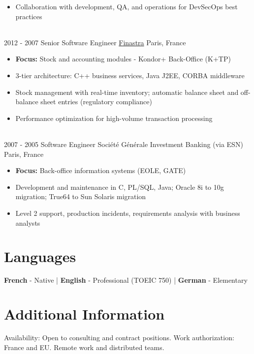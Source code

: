 \documentclass[letterpaper]{twentysecondcv} %
\begin{document}
\begin{twentytimeline}
{\begin{itemize}
		\item Collaboration with development, QA, and operations for DevSecOps best practices
		\end{itemize}}
	\\
	\twentyitemtimeline{\faCode}
		{2012 -}
		{2007}
		{Senior Software Engineer}
		{\href{https://finastra.com}{Finastra}}
		{Paris, France}
		{\begin{itemize}
		\item \textbf{Focus:} Stock and accounting modules - Kondor+ Back-Office (K+TP)
		\item 3-tier architecture: C++ business services, Java J2EE, CORBA middleware
		\item Stock management with real-time inventory; automatic balance sheet and off-balance sheet entries (regulatory compliance)
		\item Performance optimization for high-volume transaction processing
		\end{itemize}}
	\\
	\twentyitemtimeline{\faBriefcase}
		{2007 -}
		{2005}
		{Software Engineer}
		{Société Générale Investment Banking (via ESN)}
		{Paris, France}
		{\begin{itemize}
		\item \textbf{Focus:} Back-office information systems (EOLE, GATE)
		\item Development and maintenance in C, PL/SQL, Java; Oracle 8i to 10g migration; True64 to Sun Solaris migration
		\item Level 2 support, production incidents, requirements analysis with business analysts
		\end{itemize}}
\end{twentytimeline}


\section{Languages}

\textbf{French} - Native | \textbf{English} - Professional (TOEIC 750) | \textbf{German} - Elementary

\section{Additional Information}

Availability: Open to consulting and contract positions. Work authorization: France and EU. Remote work and distributed teams.

\end{document}
